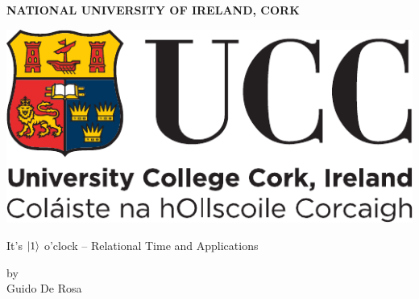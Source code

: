 \thispagestyle{empty}


\begin{centering}

\textbf{NATIONAL UNIVERSITY OF IRELAND, CORK}

\vspace{1cm}

\includegraphics[width=0.3\linewidth]{img/ucc_logo.pdf}

\vspace{0.5in}

\Huge

{It's ${\ket{1}}$ o'clock -- Relational Time and Applications}

\vspace{0.5in}

\large
by
\\
Guido De Rosa

\end{centering}

\clearpage

\restoregeometry
